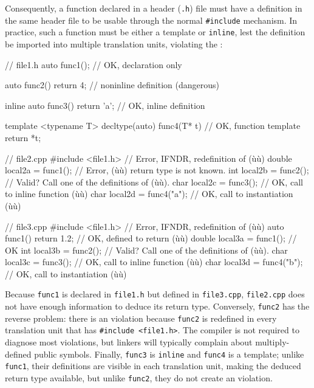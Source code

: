 \noindent Consequently, a function declared in a header (\lstinline!.h!) file must
have a definition in the same header file to be usable through the
normal \lstinline!#include! mechanism. In practice, such a function must
be either a template or \lstinline!inline!, lest the definition be imported
into multiple translation units, violating the :

\begin{emcppslisting}
// file1.h
auto func1();                        // OK, declaration only

auto func2() { return 4; }           // noninline definition (dangerous)

inline auto func3() { return 'a'; }  // OK, inline definition

template <typename T>
decltype(auto) func4(T* t)           // OK, function template
{
    return *t;
}

// file2.cpp
#include <file1.h>            // Error, IFNDR, redefinition of (ù{}ù)
double local2a = func1();     // Error, (ù{}ù) return type is not known.
int    local2b = func2();     // Valid? Call one of the definitions of (ù{}ù).
char   local2c = func3();     // OK, call to inline function (ù{}ù)
char   local2d = func4("a");  // OK, call to instantiation (ù{}ù)

// file3.cpp
#include <file1.h>            // Error, IFNDR, redefinition of (ù{}ù)
auto func1() { return 1.2; }  // OK, defined to return (ù{}ù)
double local3a = func1();     // OK
int    local3b = func2();     // Valid? Call one of the definitions of (ù{}ù).
char   local3c = func3();     // OK, call to inline function (ù{}ù)
char   local3d = func4("b");  // OK, call to instantiation (ù{}ù)
\end{emcppslisting}
    

\noindent Because \lstinline!func1! is declared in \lstinline!file1.h! but defined in
\lstinline!file3.cpp!, \lstinline!file2.cpp! does not have enough information
to deduce its return type. Conversely, \lstinline!func2! has the reverse
problem: there is an  violation because \lstinline!func2! is
redefined in every translation unit that has
\lstinline!#include!~\lstinline!<file1.h>!. The compiler is not required to
diagnose most  violations, but linkers will typically
complain about multiply-defined public symbols. Finally, \lstinline!func3!
is \lstinline!inline! and \lstinline!func4! is a template; unlike
\lstinline!func1!, their definitions are visible in each translation unit,
making the deduced return type available, but unlike \lstinline!func2!,
they do not create an  violation.

